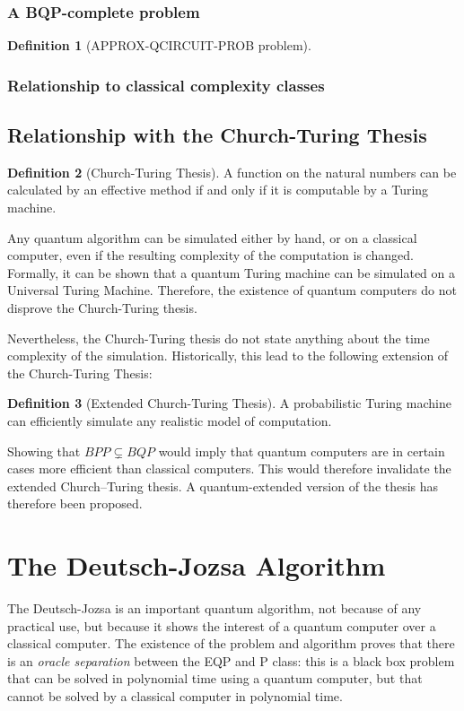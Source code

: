 \documentclass[12pt,a4paper]{article}
\theoremstyle{definition}
\newtheorem*{definition}{Definition}
\begin{document}
\subsubsection{A BQP-complete problem}
\begin{definition}[APPROX-QCIRCUIT-PROB problem]
    
\end{definition}

\subsubsection{Relationship to classical complexity classes}


\subsection{Relationship with the Church-Turing Thesis}
\begin{definition}[Church-Turing Thesis]
    A function on the natural numbers can be calculated by an effective method if and only if it is computable by a Turing machine.
\end{definition}

Any quantum algorithm can be simulated either by hand, or on a classical computer, even if the resulting complexity of the computation is changed. Formally, it can be shown that a quantum Turing machine can be simulated on a Universal Turing Machine. Therefore, the existence of quantum computers do not disprove the Church-Turing thesis.

Nevertheless, the Church-Turing thesis do not state anything about the time complexity of the simulation. Historically, this lead to the following extension of the Church-Turing Thesis:
\begin{definition}[Extended Church-Turing Thesis]
    A probabilistic Turing machine can efficiently simulate any realistic model of computation.
\end{definition}

Showing that $BPP \varsubsetneq BQP$ would imply that quantum computers are in certain cases more efficient than classical computers. This would therefore invalidate the extended Church–Turing thesis. A quantum-extended version of the thesis has therefore been proposed. %

\section{The Deutsch-Jozsa Algorithm}
The Deutsch-Jozsa is an important quantum algorithm, not because of any practical use, but because it shows the interest of a quantum computer over a classical computer. The existence of the problem and algorithm proves that there is an \emph{oracle separation} between the EQP and P class: this is a black box problem that can be solved in polynomial time using a quantum computer, but that cannot be solved by a classical computer in polynomial time.
\end{document}
